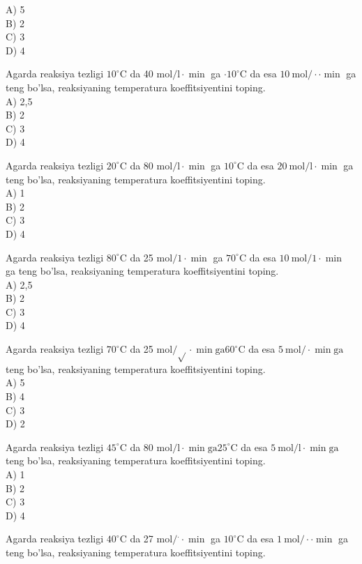 A) 5\\
B) 2\\
C) 3\\
D) 4
  \item Agarda reaksiya tezligi $10^{\circ} \mathrm{C}$ da 40 $\mathrm{mol} / \mathrm{l} \cdot \min$ ga $\cdot 10^{\circ} \mathrm{C}$ da esa $10 \mathrm{~mol} / \cdot \cdot \min$ ga teng bo'lsa, reaksiyaning temperatura koeffitsiyentini toping.\\
A) 2,5\\
B) 2\\
C) 3\\
D) 4
  \item Agarda reaksiya tezligi $20^{\circ} \mathrm{C}$ da 80 $\mathrm{mol} / \mathrm{l} \cdot \min$ ga $10^{\circ} \mathrm{C}$ da esa $20 \mathrm{~mol} / \mathrm{l} \cdot \min$ ga teng bo'lsa, reaksiyaning temperatura koeffitsiyentini toping.\\
A) 1\\
B) 2\\
C) 3\\
D) 4
  \item Agarda reaksiya tezligi $80^{\circ} \mathrm{C}$ da 25 $\mathrm{mol} / 1 \cdot \min$ ga $70^{\circ} \mathrm{C}$ da esa $10 \mathrm{~mol} / 1 \cdot \min$ ga teng bo'lsa, reaksiyaning temperatura koeffitsiyentini toping.\\
A) 2,5\\
B) 2\\
C) 3\\
D) 4
  \item Agarda reaksiya tezligi $70^{\circ} \mathrm{C}$ da 25 $\mathrm{mol} / \sqrt{ } \cdot \min \mathrm{ga} 60^{\circ} \mathrm{C}$ da esa $5 \mathrm{~mol} / \cdot \min \mathrm{ga}$ teng bo'lsa, reaksiyaning temperatura koeffitsiyentini toping.\\
A) 5\\
B) 4\\
C) 3\\
D) 2
  \item Agarda reaksiya tezligi $45^{\circ} \mathrm{C}$ da 80 $\mathrm{mol} / \mathrm{l} \cdot \min \mathrm{ga} 25^{\circ} \mathrm{C}$ da esa $5 \mathrm{~mol} / \mathrm{l} \cdot \min \mathrm{ga}$ teng bo'lsa, reaksiyaning temperatura koeffitsiyentini toping.\\
A) 1\\
B) 2\\
C) 3\\
D) 4
  \item Agarda reaksiya tezligi $40^{\circ} \mathrm{C}$ da 27 $\mathrm{mol} /{ }^{\cdot} \cdot \min$ ga $10^{\circ} \mathrm{C}$ da esa $1 \mathrm{~mol} / \cdot \cdot \min$ ga teng bo'lsa, reaksiyaning temperatura koeffitsiyentini toping.\\
